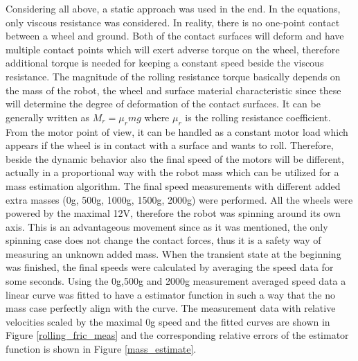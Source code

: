 \documentclass[12pt,english]{article}
\begin{document}
Considering all above, a static approach was used in the end. In the equations, only viscous resistance was considered. In reality, there is no one-point contact between a wheel and ground. Both of the contact surfaces will deform and have multiple contact points which will exert adverse torque on the wheel, therefore additional torque is needed for keeping a constant speed beside the viscous resistance. The magnitude of the rolling resistance torque basically depends on the mass of the robot, the wheel and surface material characteristic since these will determine the degree of deformation of the contact surfaces. It can be generally written as $M_r = \mu_r m g$ where $\mu_r$ is the rolling resistance coefficient. From the motor point of view, it can be handled as a constant motor load which appears if the wheel is in contact with a surface and wants to roll. Therefore, beside the dynamic behavior also the final speed of the motors will be different, actually in a proportional way with the robot mass which can be utilized for a mass estimation algorithm.
The final speed measurements with different added extra masses (0g, 500g, 1000g, 1500g, 2000g) were performed. All the wheels were powered by the maximal 12V, therefore the robot was spinning around its own axis. This is an advantageous movement since as it was mentioned, the only spinning case does not change the contact forces, thus it is a safety way of measuring an unknown added mass. When the transient state at the beginning was finished, the final speeds were calculated by averaging the speed data for some seconds. Using the 0g,500g and 2000g measurement averaged speed data a linear curve was fitted to have a estimator function in such a way that the no mass case perfectly align with the curve. The measurement data with relative velocities scaled by the maximal 0g speed and the fitted curves are shown in Figure \ref{rolling_fric_meas} and the corresponding relative errors of the estimator function is shown in Figure \ref{mass_estimate}.
\end{document}

